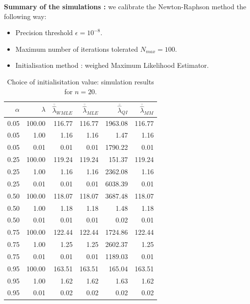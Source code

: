 \textbf{Summary of the simulations :} we calibrate the Newton-Raphson method the following way:
\begin{itemize}
    \item Precision threshold $\epsilon = 10^{-8}$. 
    \item Maximum number of iterations tolerated $N_{max} = 100$.
    \item Initialisation method : weighed Maximum Likelihood Estimator.
\end{itemize}

\begin{table}[ht] 
\centering
\begin{tabular}{|rr||rrrr|}
 \hline
 $\alpha$ & $\lambda$ & $\overline{\hat\lambda}_{WMLE}$ & $\overline{\hat\lambda}_{MLE}$ & $\overline{\hat\lambda}_{QI}$ & $\overline{\hat\lambda}_{MM}$ \\
  \hline
  \hline
 0.05 & 100.00 & 116.77 & 116.77 & 1963.08 & 116.77 \\ 
   0.05 & 1.00 & 1.16 & 1.16 & 1.47 & 1.16 \\ 
   0.05 & 0.01 & 0.01 & 0.01 & 1790.22 & 0.01 \\ 
   0.25 & 100.00 & 119.24 & 119.24 & 151.37 & 119.24 \\ 
   0.25 & 1.00 & 1.16 & 1.16 & 2362.08 & 1.16 \\ 
   0.25 & 0.01 & 0.01 & 0.01 & 6038.39 & 0.01 \\ 
   0.50 & 100.00 & 118.07 & 118.07 & 3687.48 & 118.07 \\ 
   0.50 & 1.00 & 1.18 & 1.18 & 1.48 & 1.18 \\ 
   0.50 & 0.01 & 0.01 & 0.01 & 0.02 & 0.01 \\ 
   0.75 & 100.00 & 122.44 & 122.44 & 1724.86 & 122.44 \\ 
   0.75 & 1.00 & 1.25 & 1.25 & 2602.37 & 1.25 \\ 
   0.75 & 0.01 & 0.01 & 0.01 & 1189.03 & 0.01 \\ 
   0.95 & 100.00 & 163.51 & 163.51 & 165.04 & 163.51 \\ 
   0.95 & 1.00 & 1.62 & 1.62 & 1.63 & 1.62 \\ 
   0.95 & 0.01 & 0.02 & 0.02 & 0.02 & 0.02 \\ 
   \hline
\end{tabular}
\caption{Choice of initialisitation value: simulation results for $n = 20$.}\label{tab:sim:init1}
\end{table}

